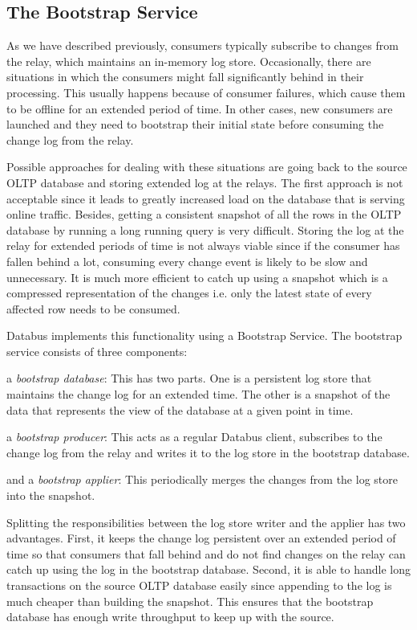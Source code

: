 \subsection{The Bootstrap Service}

As we have described previously, consumers typically subscribe to changes from the relay, which maintains an in-memory log store. Occasionally, there are situations in which the consumers might fall significantly behind in their processing. This usually happens because of consumer failures, which cause them to be offline for an extended period of time. In other cases, new consumers are launched and they need to bootstrap their initial state before consuming the change log from the relay. 

Possible approaches for dealing with these situations are going back to the source OLTP database and storing extended log at the relays. The first approach is not acceptable since it leads to greatly increased load on the database that is serving online traffic. Besides, getting a consistent snapshot of all the rows in the OLTP database by running a long running query is very difficult. Storing the log at the relay for extended periods of time is not always viable since if the consumer has fallen behind a lot, consuming every change event is likely to be slow and unnecessary. It is much more efficient to catch up using a snapshot which is a compressed representation of the changes i.e. only the latest state of every affected row needs to be consumed. 

Databus implements this functionality using a Bootstrap Service. The bootstrap service consists of three components:
\begin{itemize*}
\item a \emph{bootstrap database}: This has two parts. One is a persistent log store that maintains the change log for an extended time. The other is a snapshot of the data that represents the view of the database at a given point in time. 
\item a \emph{bootstrap producer}: This acts as a regular Databus client, subscribes to the change log from the relay and writes it to the log store in the bootstrap database. 
\item and a \emph{bootstrap applier}: This periodically merges the changes from the log store into the snapshot.
\end{itemize*}

Splitting the responsibilities between the log store writer and the applier has two advantages. First, it keeps the change log persistent over an extended period of time so that consumers that fall behind and do not find changes on the relay can catch up using the log in the bootstrap database. Second, it is able to handle long transactions on the source OLTP database easily since appending to the log is much cheaper than building the snapshot. This ensures that the bootstrap database has enough write throughput to keep up with the source. 

